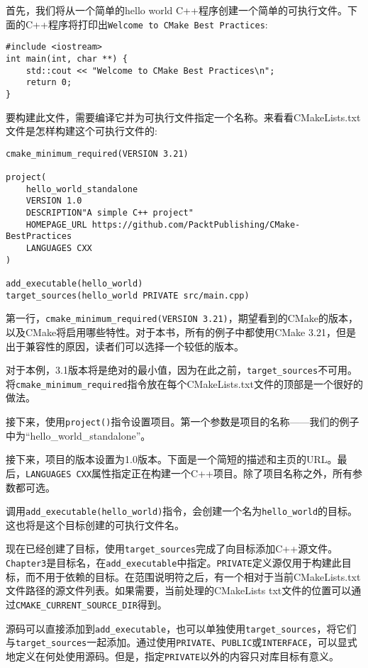 首先，我们将从一个简单的hello world C++程序创建一个简单的可执行文件。下面的C++程序将打印出\texttt{Welcome to CMake Best Practices}:

\begin{lstlisting}[style=styleCXX]
#include <iostream>
int main(int, char **) {
	std::cout << "Welcome to CMake Best Practices\n";
	return 0;
}
\end{lstlisting}

要构建此文件，需要编译它并为可执行文件指定一个名称。来看看CMakeLists.txt文件是怎样构建这个可执行文件的:

\begin{lstlisting}[style=styleCMake]
cmake_minimum_required(VERSION 3.21)

project(
	hello_world_standalone
	VERSION 1.0
	DESCRIPTION"A simple C++ project"
	HOMEPAGE_URL https://github.com/PacktPublishing/CMake-BestPractices
	LANGUAGES CXX
)

add_executable(hello_world)
target_sources(hello_world PRIVATE src/main.cpp)
\end{lstlisting}

第一行，\texttt{cmake\_minimum\_required(VERSION 3.21)}，期望看到的CMake的版本，以及CMake将启用哪些特性。对于本书，所有的例子中都使用CMake 3.21，但是出于兼容性的原因，读者们可以选择一个较低的版本。

对于本例，3.1版本将是绝对的最小值，因为在此之前，\texttt{target\_sources}不可用。将\texttt{cmake\_minimum\_required}指令放在每个CMakeLists.txt文件的顶部是一个很好的做法。

接下来，使用\texttt{project()}指令设置项目。第一个参数是项目的名称——我们的例子中为“hello\_world\_standalone”。

接下来，项目的版本设置为1.0版本。下面是一个简短的描述和主页的URL。最后，\texttt{LANGUAGES CXX}属性指定正在构建一个C++项目。除了项目名称之外，所有参数都可选。

调用\texttt{add\_executable(hello\_world)}指令，会创建一个名为\texttt{hello\_world}的目标。这也将是这个目标创建的可执行文件名。

现在已经创建了目标，使用\texttt{target\_sources}完成了向目标添加C++源文件。\texttt{Chapter3}是目标名，在\texttt{add\_executable}中指定。\texttt{PRIVATE}定义源仅用于构建此目标，而不用于依赖的目标。在范围说明符之后，有一个相对于当前CMakeLists.txt文件路径的源文件列表。如果需要，当前处理的CMakeLists txt文件的位置可以通过\texttt{CMAKE\_CURRENT\_SOURCE\_DIR}得到。

源码可以直接添加到\texttt{add\_executable}，也可以单独使用\texttt{target\_sources}，将它们与\texttt{target\_sources}一起添加。通过使用\texttt{PRIVATE}、\texttt{PUBLIC}或\texttt{INTERFACE}，可以显式地定义在何处使用源码。但是，指定\texttt{PRIVATE}以外的内容只对库目标有意义。

